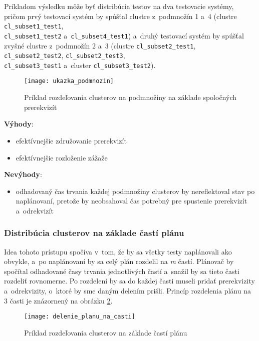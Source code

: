 Príkladom výsledku môže byť distribúcia testov na dva testovacie systémy, 
pričom prvý testovací systém by spúšťal clustre z~podmnožín 1 a~4 
(clustre \texttt{cl\_subset1\_test1}, 
\\
\texttt{cl\_subset1\_test2} a~\texttt{cl\_subset4\_test1})
a~druhý testovací systém by spúšťal zvyšné clustre z~podmnožín 2 a~3 
(clustre \texttt{cl\_subset2\_test1}, \texttt{cl\_subset2\_test2}, 
\texttt{cl\_subset2\_test3},
\\
\texttt{cl\_subset3\_test1} 
a~cluster \texttt{cl\_subset3\_test2}).

\begin{figure}[h]
  \begin{center}
    \texttt{[image: ukazka\_podmnozin]}
    \caption{Príklad rozdeľovania clusterov na podmnožiny na 
             základe spoločných prerekvizít}
    \label{obrazok:podmnoziny_testov}
  \end{center}
\end{figure}

\noindent \textbf{Výhody}:
\begin{itemize}
\item efektívnejšie združovanie prerekvizít
\item efektívnejšie rozloženie zážaže
\end{itemize} 


\noindent \textbf{Nevýhody}:
\begin{itemize}
\item odhadovaný čas trvania každej podmnožiny clusterov by nereflektoval stav 
po naplánovaní, pretože by neobsahoval čas potrebný pre spustenie 
prerekvizít a~odrekvizít
\end{itemize}

\subsubsection*{Distribúcia clusterov na základe častí plánu}
Idea tohoto prístupu spočíva v~tom, že by sa všetky testy naplánovali 
ako obvykle, a~po naplánovaní by sa celý plán rozdelil na \emph{m} častí. 
Plánovač by spočítal odhadované časy trvania jednotlivých častí a~snažil by 
sa tieto časti rozdeliť rovnomerne. Po rozdelení by sa do každej časti 
museli pridať prerekvizity a~odrekvizity, o~ktoré by sme daným 
delením prišli. 
Princíp rozdelenia plánu na 3 časti je znázornený na obrázku 
\ref{obrazok:distribucia_na_casti}.

\begin{figure}[h]
  \begin{center}
    \texttt{[image: delenie\_planu\_na\_casti]}
    \caption{Príklad rozdeľovania clusterov na základe častí plánu}
    \label{obrazok:distribucia_na_casti}
  \end{center}
\end{figure}

